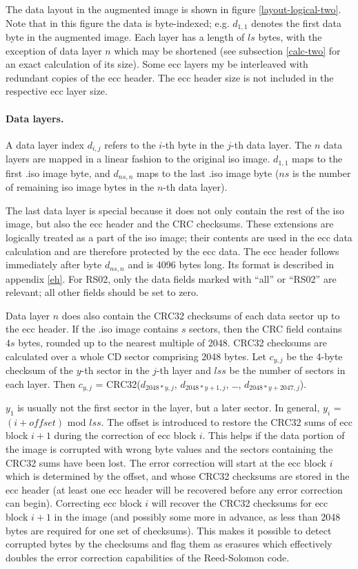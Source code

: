 The data layout in the augmented image is shown in figure \ref{layout-logical-two}.
Note that in this figure the data is byte-indexed; e.g. $d_{1,1}$ denotes the
first data byte in the augmented image. Each layer has a length of
$ls$ bytes, with the exception of data layer $n$ which may be shortened (see subsection \ref{calc-two} for an exact calculation of its size). 
Some ecc layers my be interleaved with redundant copies of the ecc header. 
The ecc header size is not included in the respective ecc layer size.

\paragraph{Data layers.} A data layer index $d_{i,j}$ refers to the $i$-th byte in the $j$-th data layer.
The $n$ data layers are mapped in a linear fashion to the original iso image.
$d_{1,1}$ maps to the first .iso image byte, and $d_{ns,n}$ maps to the last .iso image
byte ($ns$ is the number of remaining iso image bytes in the $n$-th data layer). 

The last data layer is special because it does not only contain the rest of the iso image,
but also the ecc header and the CRC checksums. These extensions 
are logically treated as a part of the iso image; their contents are used in the
ecc data calculation and are therefore protected by the ecc data.
The ecc header follows immediately after byte $d_{ns,n}$ and is 4096 bytes long.
Its format is described in appendix \ref{eh}. For RS02, only the data fields
marked with ``all'' or ``RS02'' are relevant; all other fields should be set to zero.

Data layer $n$ does also contain the CRC32 checksums of each data sector
up to the ecc header. If the .iso image contains $s$ sectors,
then the CRC field contains $4s$ bytes, rounded up
to the nearest multiple of 2048. 
CRC32 checksums are calculated over a whole CD sector comprising 2048 bytes.
Let $c_{y,j}$ be the 4-byte checksum of the $y$-th sector in the $j$-th layer
and $lss$ be the number of sectors in each layer.
Then $c_{y,j}$ = CRC32($d_{2048*y,j}$, $d_{2048*y+1,j}$, \dots, $d_{2048*y+2047,j}$).  
 
$y_1$ is usually not the first sector in the layer, but a later sector.
In general, $y_i$ = $(i+offset)$ mod $lss$. The offset is introduced to restore
the CRC32 sums of ecc block $i+1$ during the correction of ecc block $i$.
This helps if the data portion of the image is corrupted with wrong byte values and
the sectors containing the CRC32 sums have been lost. 
The error correction will start at the ecc block $i$ which is determined
by the offset, and whose CRC32 checksums are stored in the ecc header (at least one
ecc header will be recovered before any error correction can begin). Correcting
ecc block $i$ will recover the CRC32 checksums for ecc block $i+1$ in the image
(and possibly some more in advance, as less than 2048 bytes are required for
one set of checksums). This makes it possible to detect corrupted bytes by the
checksums and flag them as erasures which effectively doubles the error correction
capabilities of the Reed-Solomon code.

